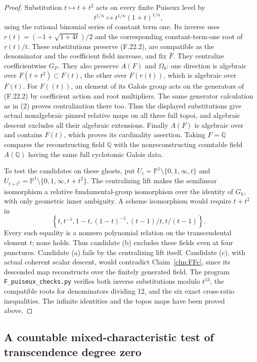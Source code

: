 \documentclass[11pt]{article}
\begin{document}
\begin{proof}
Substitution \(t\mapsto t+t^2\) acts on every finite
Puiseux level by
\[
 t^{1/n}\longmapsto t^{1/n}(1+t)^{1/n},
\]
using the rational binomial series of constant term one.
Its inverse uses
\(r(t)=(-1+\sqrt{1+4t})/2\) and the corresponding
constant-term-one root of \(r(t)/t\). These substitutions
preserve (F.22.2), are compatible as the denominator and
the coefficient field increase, and fix \(\bar F\).
They centralize coefficientwise \(G_F\). They also
preserve \(A(F)\) and \(\Omega_0\): one direction is
algebraic over \(F(t+t^2)\subset F(t)\), the other over
\(F(r(t))\), which is algebraic over \(F(t)\).
For \(F((t))\), an element of its Galois group acts on
the generators of (F.22.2) by coefficient action and
root multipliers. The same generator calculation as in
(2) proves centralization there too. Thus the displayed
substitutions give actual nonalgebraic pinned relative
maps on all three full topoi, and algebraic descent
excludes all their algebraic extensions. Finally \(A(F)\)
is algebraic over and contains \(F(t)\), which proves
its cardinality assertion. Taking \(F=\mathbb Q\)
compares the reconstructing field \(\mathbb Q\) with
the nonreconstructing countable field \(A(\mathbb Q)\)
having the same full cyclotomic Galois data.

To test the candidates on these ghosts, put
\(U_t=\mathbb P^1\setminus\{0,1,\infty,t\}\)
and \(U_{t+t^2}=\mathbb P^1\setminus
\{0,1,\infty,t+t^2\}\). The centralizing lift makes
the semilinear isomorphism a relative fundamental-group
isomorphism over the identity of \(G_k\), with only
geometric inner ambiguity. A scheme isomorphism would
require \(t+t^2\) in
\[
 \left\{t,t^{-1},1-t,(1-t)^{-1},
                    (t-1)/t,t/(t-1)\right\}.
\]
Every such equality is a nonzero polynomial relation on
the transcendental element \(t\); none holds. Thus
candidate (b) excludes these fields even at four punctures.
Candidate (a) fails by the centralizing lift itself.
Candidate (c), with actual coherent scalar descent,
would contradict Claim~\ref{clm:FFc}, since its descended
map reconstructs over the finitely generated field.
The program \texttt{F\_puiseux\_checks.py} verifies both
inverse substitutions modulo \(t^{13}\), the compatible
roots for denominators dividing 12, and the six exact
cross-ratio inequalities. The infinite identities and
the topos maps have been proved above.
\end{proof}

\subsection{A countable mixed-characteristic test of transcendence degree zero}
\end{document}

